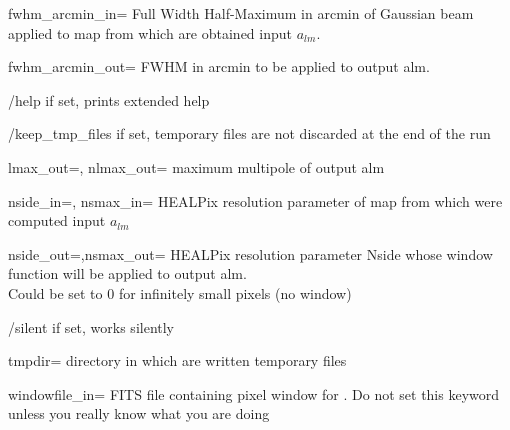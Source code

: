 \begin{keywords}
\begin{kwlist}{}
 \item[fwhm\_arcmin\_in=]   Full Width
Half-Maximum in arcmin of Gaussian beam applied to map from which are obtained
input $a_{lm}$.\\

 \item[fwhm\_arcmin\_out=]  FWHM in
arcmin to be applied to output alm.\\ 

 \item[/help]       if set, prints extended help
\item[/keep\_tmp\_files]  if set,
temporary files are not discarded at the end of the run

 \item[lmax\_out=, nlmax\_out=]    
 maximum multipole of output alm

 \item[nside\_in=, nsmax\_in=]     
HEALPix resolution parameter of map
                  from which were computed input $a_{lm}$

 \item[nside\_out=,nsmax\_out=]    
HEALPix resolution parameter Nside whose
                  window function will be applied to output alm.\\
                  Could be set to 0 for infinitely small pixels (no window)

\item[/silent]     if set, works silently

\item[tmpdir=]       directory in which are written temporary files 

 \item[windowfile\_in=]  %
    FITS file containing pixel window for 
        .
      Do not set this keyword unless you really know what you are doing


\end{kwlist}
\end{keywords}
